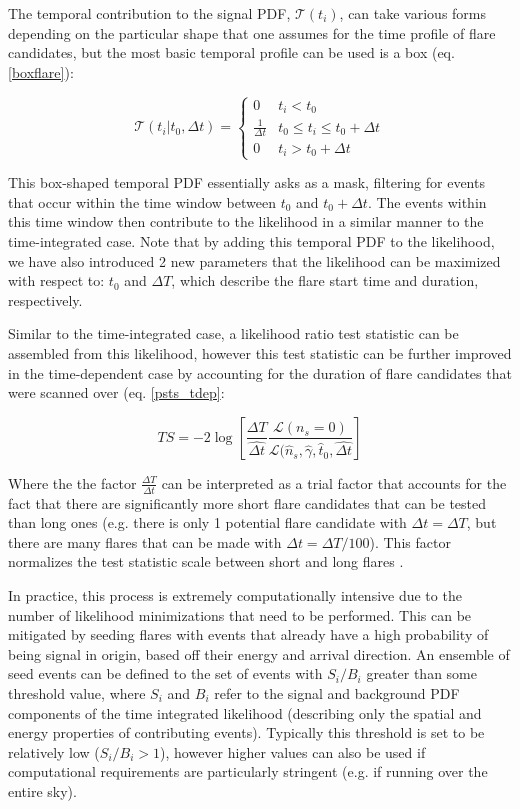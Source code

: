 The temporal contribution to the signal PDF, $\mathcal{T}(t_i)$, can take various forms depending on the particular shape that one assumes for the time profile of flare candidates, but the most basic temporal profile can be used is a box (eq. \ref{boxflare}):

\begin{equation}
    \mathcal{T}(t_i | t_0, \Delta t) = 
    \begin{cases} 
      0 & t_i < t_0 \\
      \frac{1}{\Delta t} & t_0 \leq t_i \leq t_0+\Delta t \\
      0 & t_i > t_0 + \Delta t
   \end{cases}
   \label{boxflare}
\end{equation}

This box-shaped temporal PDF essentially asks as a mask, filtering for events that occur within the time window between $t_0$ and $t_0 + \Delta t$. The events within this time window then contribute to the likelihood in a similar manner to the time-integrated case. Note that by adding this temporal PDF to the likelihood, we have also introduced 2 new parameters that the likelihood can be maximized with respect to: $t_0$ and $\Delta T$, which describe the flare start time and duration, respectively. 

Similar to the time-integrated case, a likelihood ratio test statistic can be assembled from this likelihood, however this test statistic can be further improved in the time-dependent case by accounting for the duration of flare candidates that were scanned over (eq. \ref{psts_tdep}:

\begin{equation}
    TS = -2 \log [\frac{\Delta T}{\hat{\Delta t}}\frac{\mathcal{L}(n_s=0)}{\mathcal{L}(\hat{n}_s, \hat{\gamma}, \hat{t}_0, \hat{\Delta t}}]
    \label{psts_tdep}
\end{equation}

Where the the factor $\frac{\Delta T}{\Delta t}$ can be interpreted as a trial factor that accounts for the fact that there are significantly more short flare candidates that can be tested than long ones (e.g. there is only 1 potential flare candidate with $\Delta t = \Delta T$, but there are many flares that can be made with $\Delta t = \Delta T/100$). This factor normalizes the test statistic scale between short and long flares \cite{Braun_2010}.

In practice, this process is extremely computationally intensive due to the number of likelihood minimizations that need to be performed. This can be mitigated by seeding flares with events that already have a high probability of being signal in origin, based off their energy and arrival direction. An ensemble of seed events can be defined to the set of events with $S_i/B_i$ greater than some threshold value, where $S_i$ and $B_i$ refer to the signal and background PDF components of the time integrated likelihood (describing only the spatial and energy properties of contributing events). Typically this threshold is set to be relatively low ($S_i/B_i > 1$), however higher values can also be used if computational requirements are particularly stringent (e.g. if running over the entire sky). 

